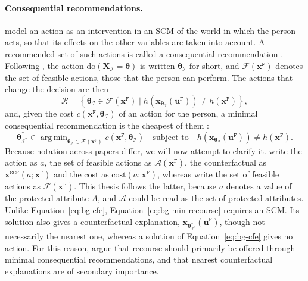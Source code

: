\paragraph{Consequential recommendations.}
\citet{karimi2021algorithmic} model an action as an intervention in an SCM of the world in which
the person acts, so that its effects on the other variables are taken into account. A recommended
set of such actions is called a consequential recommendation \cite{karimi2022survey}. Following
\citet{vonkugelgen2022fairness}, the action $\mathrm{do}(\mathbf{X}_{\mathcal{I}} =
\boldsymbol{\theta})$ is written $\boldsymbol{\theta}_{\mathcal{I}}$ for short, and
$\mathcal{F}(\mathbf{x}^{\mathtt{F}})$ denotes the set of feasible actions, those that the person can
perform. The actions that change the decision are then
\begin{equation}
  \mathcal{R} = \left\{ \boldsymbol{\theta}_{\mathcal{I}} \in \mathcal{F}(\mathbf{x}^{\mathtt{F}})
  \mid h(\mathbf{x}_{\boldsymbol{\theta}_{\mathcal{I}}}(\mathbf{u}^{\mathtt{F}})) \neq
  h(\mathbf{x}^{\mathtt{F}}) \right\},
  \label{eq:bg-recourse}
\end{equation}
and, given the cost $c(\mathbf{x}^{\mathtt{F}}, \boldsymbol{\theta}_{\mathcal{I}})$ of an action for
the person, a minimal consequential recommendation is the cheapest of them \cite{karimi2022survey}:
\begin{equation}
  \boldsymbol{\theta}^{*}_{\mathcal{I}^{*}} \in \mathop{\mathrm{arg\,min}}_{\boldsymbol{\theta}_{\mathcal{I}}
  \in \mathcal{F}(\mathbf{x}^{\mathtt{F}})} c(\mathbf{x}^{\mathtt{F}}, \boldsymbol{\theta}_{\mathcal{I}})
  \quad \mbox{subject to} \quad
  h(\mathbf{x}_{\boldsymbol{\theta}_{\mathcal{I}}}(\mathbf{u}^{\mathtt{F}})) \neq h(\mathbf{x}^{\mathtt{F}}).
  \label{eq:bg-min-recourse}
\end{equation}
Because notation across papers differ, we will now attempt to clarify it. \citet{karimi2022survey} write the action as
$a$, the set of feasible actions as $\mathcal{A}(\mathbf{x}^{\mathtt{F}})$, the counterfactual as
$\mathbf{x}^{\mathtt{SCF}}(a; \mathbf{x}^{\mathtt{F}})$ and the cost as
$\mathrm{cost}(a; \mathbf{x}^{\mathtt{F}})$, whereas \citet{vonkugelgen2022fairness} write the set
of feasible actions as $\mathcal{F}(\mathbf{x}^{\mathtt{F}})$. This thesis follows the latter,
because $a$ denotes a value of the protected attribute $A$, and $\mathcal{A}$ could be read as the
set of protected attributes. Unlike
Equation~\ref{eq:bg-cfe}, Equation~\ref{eq:bg-min-recourse} requires an SCM. Its solution also
gives a counterfactual explanation, $\mathbf{x}_{\boldsymbol{\theta}^{*}_{\mathcal{I}^{*}}}
(\mathbf{u}^{\mathtt{F}})$, though not necessarily the nearest one, whereas a solution of
Equation~\ref{eq:bg-cfe} gives no action. For this reason, \citet{karimi2022survey} argue that
recourse should primarily be offered through minimal consequential recommendations, and that
nearest counterfactual explanations are of secondary importance.

